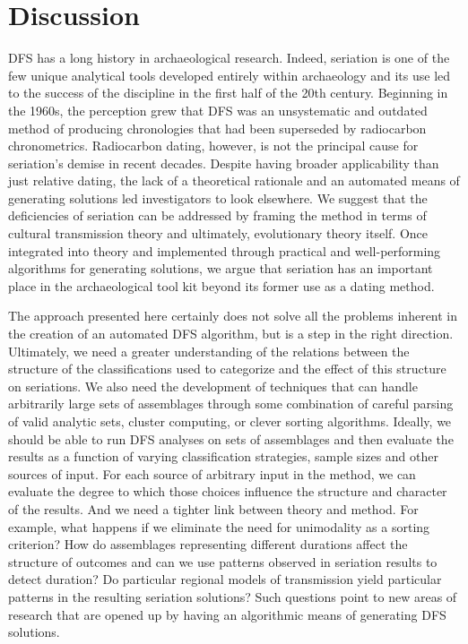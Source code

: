 \documentclass[10pt,letterpaper]{article}
\begin{document}
\section*{Discussion}

DFS has a long history in archaeological research. Indeed, seriation is one of the few unique analytical tools developed entirely within archaeology and its use led to the success of the discipline in the first half of the 20th century. Beginning in the 1960s, the perception grew that DFS was an unsystematic and outdated method of producing chronologies that had been superseded by radiocarbon chronometrics. Radiocarbon dating, however, is not the principal cause for seriation's demise in recent decades. Despite having broader applicability than just relative dating, the lack of a theoretical rationale and an automated means of generating solutions led investigators to look elsewhere. We suggest that the deficiencies of seriation can be addressed by framing the method in terms of cultural transmission theory and ultimately, evolutionary theory itself. Once integrated into theory and implemented through practical and well-performing algorithms for generating solutions, we argue that seriation has an important place in the archaeological tool kit beyond its former use as a dating method. 

The approach presented here certainly does not solve all the problems inherent in the creation of an automated DFS algorithm, but is a step in the right direction. Ultimately, we need a greater understanding of the relations between the structure of the classifications used to categorize and the effect of this structure on seriations. We also need the development of techniques that can handle arbitrarily large sets of assemblages through some combination of careful parsing of valid analytic sets, cluster computing, or clever sorting algorithms. Ideally, we should be able to run DFS analyses on sets of assemblages and then evaluate the results as a function of varying classification strategies, sample sizes and other sources of input. For each source of arbitrary input in the method, we can evaluate the degree to which those choices influence the structure and character of the results. And we need a tighter link between theory and method.  For example, what happens if we eliminate the need for unimodality as a sorting criterion? How do assemblages representing different durations affect the structure of outcomes and can we use patterns observed in seriation results to detect duration?  Do particular regional models of transmission yield particular patterns in the resulting seriation solutions? Such questions point to new areas of research that are opened up by having an algorithmic means of generating DFS solutions.
\end{document}
